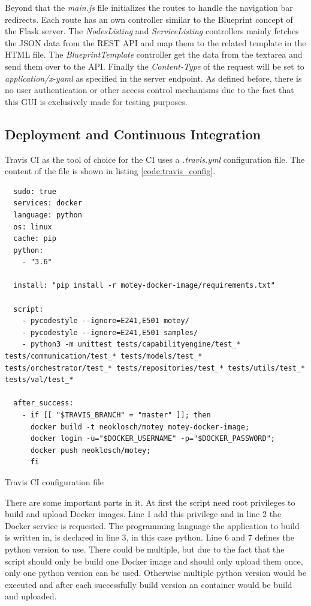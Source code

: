 Beyond that the \textit{main.js} file initializes the routes to handle the navigation bar redirects.
Each route has an own controller similar to the Blueprint concept of the Flask server.
The \textit{NodesListing} and \textit{ServiceListing} controllers mainly fetches the \ac{JSON} data from the \ac{REST} \ac{API} and map them to the related template in the \ac{HTML} file.
The \textit{BlueprintTemplate} controller get the data from the textarea and send them over to the \ac{API}.
Finally the \textit{Content-Type} of the request will be set to \textit{application/x-yaml} as specified in the server endpoint.
As defined before, there is no user authentication or other access control mechanisms due to the fact that this \ac{GUI} is exclusively made for testing purposes.

\subsection{Deployment and Continuous Integration}
Travis CI as the tool of choice for the \ac{CI} uses a \textit{.travis.yml} configuration file.
The content of the file is shown in listing \ref{code:travis_config}.

\begin{listing}[H]
  \begin{verbatim}
  sudo: true
  services: docker
  language: python
  os: linux
  cache: pip
  python:
    - "3.6"

  install: "pip install -r motey-docker-image/requirements.txt"

  script:
    - pycodestyle --ignore=E241,E501 motey/
    - pycodestyle --ignore=E241,E501 samples/
    - python3 -m unittest tests/capabilityengine/test_* tests/communication/test_* tests/models/test_* tests/orchestrator/test_* tests/repositories/test_* tests/utils/test_* tests/val/test_*

  after_success:
    - if [[ "$TRAVIS_BRANCH" = "master" ]]; then
      docker build -t neoklosch/motey motey-docker-image;
      docker login -u="$DOCKER_USERNAME" -p="$DOCKER_PASSWORD";
      docker push neoklosch/motey;
      fi
  \end{verbatim}
  \caption{Travis CI configuration file}
  \label{code:travis_config}
\end{listing}

There are some important parts in it.
At first the script need root privileges to build and upload Docker images.
Line 1 add this privilege and in line 2 the Docker service is requested.
The programming language the application to build is written in, is declared in line 3, in this case python.
Line 6 and 7 defines the python version to use.
There could be multiple, but due to the fact that the script should only be build one Docker image and should only upload them once, only one python version can be used.
Otherwise multiple python version would be executed and after each successfully build version an container would be build and uploaded.\newline

